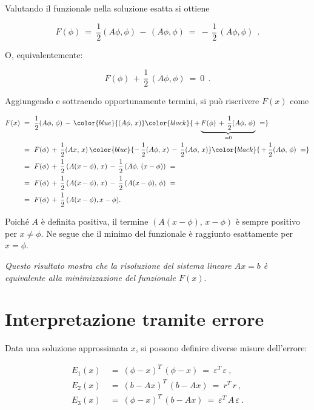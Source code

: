 Valutando il funzionale nella soluzione esatta si ottiene

\begin{equation*}
	F(\phi)\ =\ \frac{1}{2}(A\phi, \phi)\, -\, (A\phi, \phi)\ =\ -\,\frac{1}{2}\,(A\phi, \phi)\ \ .
\end{equation*}

O, equivalentemente:

\begin{equation*}
	F(\phi)\, +\, \frac{1}{2}\,(A\phi, \phi)\ =\ 0\ \ .
\end{equation*}

Aggiungendo e sottraendo opportunamente termini, si può riscrivere $F(x)$ come

\begin{equation*}
	\begin{aligned}
		F(x)\ &=\ \frac{1}{2}(A\phi,\, \phi)\,-\,\color{blue}{(A\phi,\,  x)}\color{black}{\,+\,\underset{=0}{\underbrace{F(\phi)\,+\, \frac{1}{2}(A\phi,\,  \phi)}}\ =}\\
		&=\ F(\phi)\,+\, \frac{1}{2}(Ax,\,  x)\, \color{blue}{-\,\frac{1}{2}(A\phi, \, x)\, -\,\frac{1}{2}(A\phi,\,  x)}\color{black}{\,+\, \frac{1}{2}(A\phi,\,  \phi)\ =}\\
		&=\ F(\phi)\, +\, \frac{1}{2}\,(A(x-\phi),\, x)\, -\, \frac{1}{2}\,(A\phi, \,(x-\phi))\ =\\ 
		&=\ F(\phi)\, +\,\frac{1}{2}\,(A(x-\phi),\, x)\, -\, \frac{1}{2}\,(A(x-\phi),\, \phi)\ =\\
		&=\ F(\phi)\, +\, \frac{1}{2}\,(A(x-\phi), x-\phi) 
 .	\end{aligned}
\end{equation*}

Poiché $A$ è definita positiva, il termine $(A(x-\phi),\,  x-\phi)$ è sempre positivo per $x \neq \phi$. Ne segue che il minimo del funzionale è raggiunto esattamente per $x = \phi$.

\emph{Questo risultato mostra che la risoluzione del sistema lineare $Ax = b$ è equivalente alla minimizzazione del funzionale $F(x)$}.

\section{Interpretazione tramite errore}

Data una soluzione approssimata $x$, si possono definire diverse misure dell'errore:

\begin{equation}
	\label{errori gradiente}
	\begin{aligned}
		E_1(x)\ &=\ (\phi - x)^T\, (\phi - x)\ =\ \varepsilon^T\, \varepsilon\ , \\
		E_2(x)\ &=\ (b - Ax)^T\, (b - Ax)\ =\ r^T\, r\ , \\
		E_3(x)\ &=\ (\phi - x)^T\, (b - Ax)\ =\ \varepsilon^T\, A\, \varepsilon\ .
	\end{aligned}
\end{equation}

